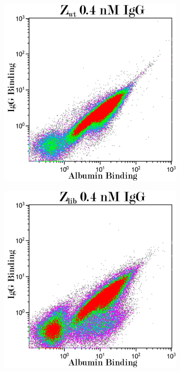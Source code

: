 \documentclass{article}
\begin{document}
\begin{multicols}{2}
\begin{figure}[H]
		\centering
		\begin{subfigure}{0.45\linewidth}
			\includegraphics[width=\linewidth]{images/flow_04_wt.png}
			\label{flow_11}
		\end{subfigure}
		\begin{subfigure}{0.45\linewidth}
			\includegraphics[width=\linewidth]{images/flow_04_lib.png}
			\label{flow_12}
			

\end{subfigure}
\end{figure}
\end{multicols}
\end{document}
